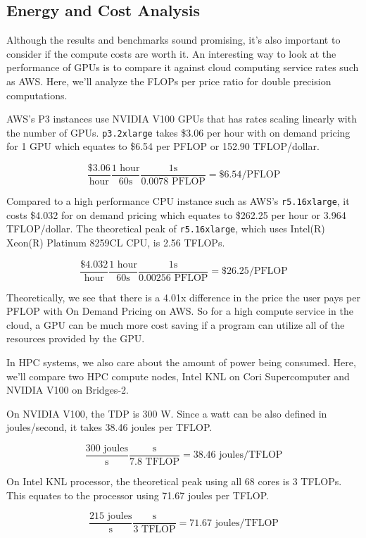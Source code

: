 \documentclass{article}
\begin{document}
\subsection{Energy and Cost Analysis}
Although the results and benchmarks sound promising, it's also important to consider if the compute costs are worth it.
An interesting way to look at the performance of GPUs is to compare it against cloud computing service rates such as AWS. \cite{aws} Here, we'll analyze the FLOPs per price ratio for double precision computations.

AWS's P3 instances use NVIDIA V100 GPUs that has rates scaling linearly with the number of GPUs. \verb|p3.2xlarge| takes \$3.06 per hour with on demand pricing for 1 GPU which equates to \$6.54 per PFLOP or 152.90 TFLOP/dollar.

$$\frac{\$3.06}{\textrm{hour}}\frac{1 \textrm{ hour}}{60 \textrm{s}}\frac{1 \textrm{s}}{0.0078\textrm{ PFLOP}} = \$6.54/\textrm{PFLOP}$$


Compared to a high performance CPU instance such as AWS's \verb|r5.16xlarge|, it costs \$4.032 for on demand pricing which equates to \$262.25 per hour or 3.964 TFLOP/dollar. The theoretical peak of \verb|r5.16xlarge|, which uses Intel(R) Xeon(R) Platinum 8259CL CPU, is 2.56 TFLOPs.

$$\frac{\$4.032}{\textrm{hour}}\frac{1 \textrm{ hour}}{60 \textrm{s}}\frac{1 \textrm{s}}{0.00256\textrm{ PFLOP}} = \$26.25/\textrm{PFLOP}$$

Theoretically, we see that there is a 4.01x difference in the price the user pays per PFLOP with On Demand Pricing on AWS. So for a high compute service in the cloud, a GPU can be much more cost saving if a program can utilize all of the resources provided by the GPU.

In HPC systems, we also care about the amount of power being consumed. Here, we'll compare two HPC compute nodes, Intel KNL on Cori Supercomputer and NVIDIA V100 on Bridges-2.

On NVIDIA V100, the TDP is 300 W. Since a watt can be also defined in joules/second, it takes 38.46 joules per TFLOP. \cite{v100}

$$\frac{300\textrm{ joules}}{\textrm{s}}\frac{\textrm{s}}{7.8 \textrm{ TFLOP}} = 38.46 \textrm{ joules/TFLOP}$$


On Intel KNL processor, the theoretical peak using all 68 cores is 3 TFLOPs. This equates to the processor using 71.67 joules per TFLOP. \cite{knl}

$$\frac{215\textrm{ joules}}{\textrm{s}}\frac{\textrm{s}}{3 \textrm{ TFLOP}} = 71.67 \textrm{ joules/TFLOP}$$
\end{document}
